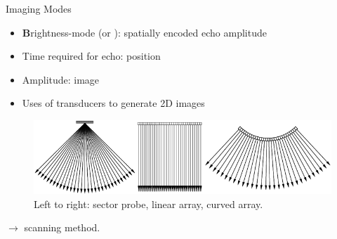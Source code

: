 \begin{frame}{Imaging Modes \cont}

    \begin{itemize}
        \item \textbf{B}rightness-mode (or ): spatially encoded echo amplitude
        \item Time required for echo: position
        \item Amplitude: image 
        \item Uses  of transducers to generate 2D images
    \end{itemize}

    \vspace{.3cm}
    \begin{figure}
        \centering
        \includegraphics[width=.7\linewidth]{images/transducer_arrays.png}\\
        {\Large Left to right: sector probe, linear array, curved array.}
    \end{figure}


    $\rightarrow$  scanning method.

\end{frame}


